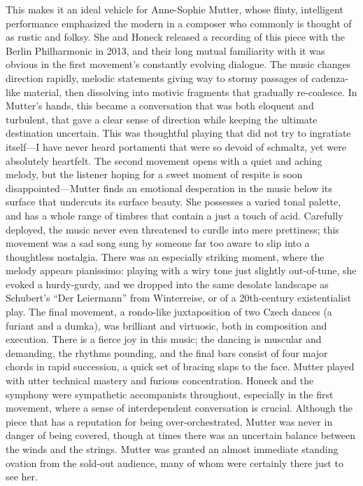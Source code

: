 This makes it an ideal vehicle for Anne-Sophie Mutter, whose flinty, intelligent performance emphasized the modern in a composer who commonly is thought of as rustic and folksy. She and Honeck released a recording of this piece with the Berlin Philharmonic in 2013, and their long mutual familiarity with it was obvious in the first movement’s constantly evolving dialogue. The music changes direction rapidly, melodic statements giving way to stormy passages of cadenza-like material, then dissolving into motivic fragments that gradually re-coalesce. In Mutter’s hands, this became a conversation that was both eloquent and turbulent, that gave a clear sense of direction while keeping the ultimate destination uncertain. This was thoughtful playing that did not try to ingratiate itself—I have never heard portamenti that were so devoid of schmaltz, yet were absolutely heartfelt. The second movement opens with a quiet and aching melody, but the listener hoping for a sweet moment of respite is soon disappointed—Mutter finds an emotional desperation in the music below its surface that undercuts its surface beauty. She possesses a varied tonal palette, and has a whole range of timbres that contain a just a touch of acid. Carefully deployed, the music never even threatened to curdle into mere prettiness; this movement was a sad song sung by someone far too aware to slip into a thoughtless nostalgia. There was an especially striking moment, where the melody appears pianissimo: playing with a wiry tone just slightly out-of-tune, she evoked a hurdy-gurdy, and we dropped into the same desolate landscape as Schubert’s “Der Leiermann” from Winterreise, or of a 20th-century existentialist play. The final movement, a rondo-like juxtaposition of two Czech dances (a furiant and a dumka), was brilliant and virtuosic, both in composition and execution. There is a fierce joy in this music; the dancing is muscular and demanding, the rhythms pounding, and the final bars consist of four major chords in rapid succession, a quick set of bracing slaps to the face. Mutter played with utter technical mastery and furious concentration. Honeck and the symphony were sympathetic accompanists throughout, especially in the first movement, where a sense of interdependent conversation is crucial. Although the piece that has a reputation for being over-orchestrated, Mutter was never in danger of being covered, though at times there was an uncertain balance between the winds and the strings. Mutter was granted an almost immediate standing ovation from the sold-out audience, many of whom were certainly there just to see her.

